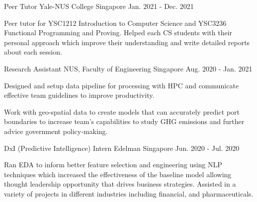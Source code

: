 \begin{cventries}
  \cventry
    {Peer Tutor} %
    {Yale-NUS College} %
    {Singapore} %
    {Jan. 2021 - Dec. 2021} %
    {
      \begin{cvitems} %
        \item {Peer tutor for YSC1212 Introduction to Computer Science and YSC3236 Functional Programming and Proving.  Helped each CS students with their personal approach which improve their understanding and write detailed reports about each session.}
      \end{cvitems}
    }
    
  \cventry
    {Research Assistant} %
    {NUS, Faculty of Engineering} %
    {Singapore} %
    {Aug. 2020 - Jan. 2021} %
    {
      \begin{cvitems} %
        \item {Designed and setup data pipeline for processing with HPC and communicate effective team guidelines to improve productivity.}
        \item {Work with geo-spatial data to create models that can accurately predict port boundaries to increase team’s capabilities to study GHG emissions and further advice government policy-making.}
      \end{cvitems}
    }
    
  \cventry
    {DxI (Predictive Intelligence) Intern} %
    {Edelman} %
    {Singapore} %
    {Jun. 2020 - Jul. 2020} %
    {
      \begin{cvitems} %
        \item {Ran EDA to inform better feature selection and engineering using NLP techniques which increased the effectiveness of the baseline model allowing thought leadership opportunity that drives business strategies.  Assisted in a variety of projects in different industries including financial, and pharmaceuticals.}
      \end{cvitems}
    }
    

\end{cventries}
